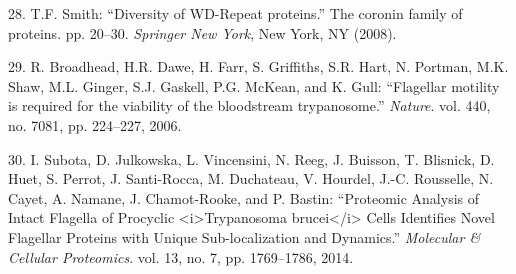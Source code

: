 \documentclass[12pt,twoside]{ugathesis}
\begin{document}
\hypertarget{ref-Smith2008}{}
28. T.F. Smith: ``Diversity of WD-Repeat proteins.'' The coronin family
of proteins. pp. 20--30. \emph{Springer New York}, New York, NY (2008).

\hypertarget{ref-Broadhead2006}{}
29. R. Broadhead, H.R. Dawe, H. Farr, S. Griffiths, S.R. Hart, N.
Portman, M.K. Shaw, M.L. Ginger, S.J. Gaskell, P.G. McKean, and K. Gull:
``Flagellar motility is required for the viability of the bloodstream
trypanosome.'' \emph{Nature}. vol. 440, no. 7081, pp. 224--227, 2006.

\hypertarget{ref-Subota2014}{}
30. I. Subota, D. Julkowska, L. Vincensini, N. Reeg, J. Buisson, T.
Blisnick, D. Huet, S. Perrot, J. Santi-Rocca, M. Duchateau, V. Hourdel,
J.-C. Rousselle, N. Cayet, A. Namane, J. Chamot-Rooke, and P. Bastin:
``Proteomic Analysis of Intact Flagella of Procyclic
\textless{}i\textgreater{}Trypanosoma brucei\textless{}/i\textgreater{}
Cells Identifies Novel Flagellar Proteins with Unique Sub-localization
and Dynamics.'' \emph{Molecular \& Cellular Proteomics}. vol. 13, no. 7,
pp. 1769--1786, 2014.


\end{document}
